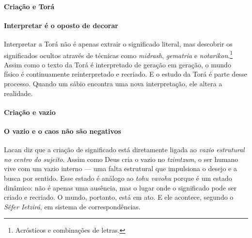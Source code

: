 \paragraph{Criação e Torá} 

\paragraph{Interpretar é o oposto de decorar} Interpretar a Torá não é apenas extrair o significado literal, mas descobrir os significados ocultos através de técnicas como \textit{midrash}, \textit{gematria} e \textit{notarikon}.\footnote{Acrósticos e combinações de letras.} Assim como o texto da Torá é interpretado de geração em geração, o mundo físico é continuamente reinterpretado e recriado. E o estudo da Torá é parte desse processo. Quando um sábio encontra uma nova interpretação, ele altera a realidade.

\paragraph{Criação e vazio} 

\paragraph{O vazio e o caos não são negativos} Lacan diz que a criação de significado está diretamente ligada ao \textit{vazio estrutural no centro do sujeito}. Assim como Deus cria o vazio no \textit{tzimtzum}, o ser humano vive com um vazio interno --- uma falta estrutural que impulsiona o desejo e a busca por sentido. Esse estado é análogo ao \textit{tohu vavohu} porque é um estado dinâmico: não é apenas uma ausência, mas o lugar onde o significado pode ser criado e recriado. O mundo, portanto, está em ato. E ele acontece, segundo o \textit{Sêfer Ietzirá}, em sistema de correspondências.

